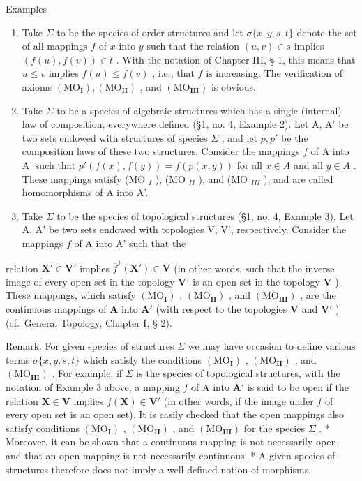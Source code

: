 Examples

\begin{enumerate}
\def\labelenumi{(\arabic{enumi})}
\item
  Take \(\Sigma\) to be the species of order structures and let \(\sigma\{x, y, s, t\}\) denote the set of all mappings \(f\) of \(x\) into \(y\) such that the relation \((u, v) \in s\) implies \((f(u), f(v)) \in t\) . With the notation of Chapter III, § 1, this means that \(u \leqslant v\) implies \(f(u) \leqslant f(v)\) , i.e., that \(f\) is increasing. The verification of axioms \((\mathrm{MO}_{\mathbf{I}}), (\mathrm{MO}_{\mathbf{II}})\) , and \((\mathrm{MO}_{\mathbf{III}})\) is obvious.
\item
  Take \(\Sigma\) to be a species of algebraic structures which has a single (internal) law of composition, everywhere defined (§1, no. 4, Example 2). Let A, A' be two sets endowed with structures of species \(\Sigma\) , and let \(p, p'\) be the composition laws of these two structures. Consider the mappings \(f\) of A into A' such that \(p'(f(x), f(y)) = f(p(x, y))\) for all \(x \in A\) and all \(y \in A\) . These mappings satisfy (MO \(_{I}\) ), (MO \(_{II}\) ), and (MO \(_{III}\) ), and are called homomorphisms of A into A'.
\item
  Take \(\Sigma\) to be the species of topological structures (§1, no. 4, Example 3). Let A, A' be two sets endowed with topologies V, V', respectively. Consider the mappings \(f\) of A into A' such that the
\end{enumerate}

relation \(\mathbf{X}' \in \mathbf{V}'\) implies \(\overline{f}^{1}(\mathbf{X}') \in \mathbf{V}\) (in other words, such that the inverse image of every open set in the topology \(\mathbf{V}'\) is an open set in the topology \(\mathbf{V}\) ). These mappings, which satisfy \((\mathrm{MO}_{\mathbf{I}})\) , \((\mathrm{MO}_{\mathbf{II}})\) , and \((\mathrm{MO}_{\mathbf{III}})\) , are the continuous mappings of \(\mathbf{A}\) into \(\mathbf{A}'\) (with respect to the topologies \(\mathbf{V}\) and \(\mathbf{V}'\) ) (cf.~General Topology, Chapter I, § 2).

Remark. For given species of structures \(\Sigma\) we may have occasion to define various terms \(\sigma \{x, y, s, t\}\) which satisfy the conditions \((\mathrm{MO}_{\mathbf{I}})\) , \((\mathrm{MO}_{\mathbf{II}})\) , and \((\mathrm{MO}_{\mathbf{III}})\) . For example, if \(\Sigma\) is the species of topological structures, with the notation of Example 3 above, a mapping \(f\) of A into \(\mathbf{A}'\) is said to be open if the relation \(\mathbf{X} \in \mathbf{V}\) implies \(f(\mathbf{X}) \in \mathbf{V}'\) (in other words, if the image under \(f\) of every open set is an open set). It is easily checked that the open mappings also satisfy conditions \((\mathrm{MO}_{\mathbf{I}})\) , \((\mathrm{MO}_{\mathbf{II}})\) , and \((\mathrm{MO}_{\mathbf{III}})\) for the species \(\Sigma\) . * Moreover, it can be shown that a continuous mapping is not necessarily open, and that an open mapping is not necessarily continuous. * A given species of structures therefore does not imply a well-defined notion of morphisms.

